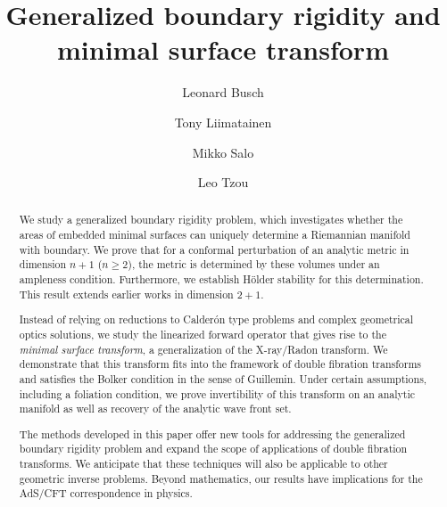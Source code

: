 \documentclass[11pt]{amsart}
\theoremstyle{definition}
\numberwithin{equation}{section}
\begin{document}
\title{Generalized boundary rigidity and minimal surface transform} 
\author[L. Busch]{Leonard Busch}
\address{Korteweg-de Vries Institute, University of Amsterdam, Amsterdam, Netherlands}
\author[T. Liimatainen]{Tony Liimatainen}
\address{Department of Mathematics and Statistics, University of Jyv\"askyl\"a, PO Box 35, 40014 Jyv\"askyl\"a, Finland}
\author[M. Salo]{Mikko Salo}
\address{Department of Mathematics and Statistics, University of Jyv\"askyl\"a, PO Box 35, 40014 Jyv\"askyl\"a, Finland}
\author[L. Tzou]{Leo Tzou}
\address{School of Mathematics and Statistics, University of Melbourne, Melbourne, Australia}











\begin{abstract}
We study a generalized boundary rigidity problem, which investigates whether the areas of embedded minimal surfaces can uniquely determine a Riemannian manifold with boundary. We prove that for a conformal perturbation of an analytic metric in dimension \( n+1 \) (\( n \geq 2 \)), the metric is determined by these volumes under an ampleness condition. Furthermore, we establish H\"older stability for this determination. This result extends earlier works in dimension \( 2+1 \).%

Instead of relying on reductions to Calder\'on type problems and complex geometrical optics solutions, we study the linearized forward operator that gives rise to the \emph{minimal surface transform}, a generalization of the X-ray/Radon transform. We demonstrate that this transform fits into the framework of double fibration transforms and satisfies the Bolker condition in the sense of Guillemin. Under certain assumptions, including a foliation condition, we prove invertibility of this transform on an analytic manifold as well as recovery of the analytic wave front set.

The methods developed in this paper offer new tools for addressing the generalized boundary rigidity problem and expand the scope of applications of double fibration transforms. We anticipate that these techniques will also be applicable to other geometric inverse problems. Beyond mathematics, our results have implications for the AdS/CFT correspondence in physics.








\end{abstract}
\end{document}
